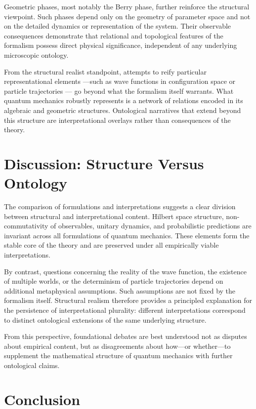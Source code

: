 Geometric phases, most notably the Berry phase, further reinforce the structural viewpoint.
Such phases depend only on the geometry of parameter space and not on the detailed dynamics
or representation of the system. Their observable consequences demonstrate that relational 
and topological features of the formalism possess direct physical significance, independent
of any underlying microscopic ontology.

From the structural realist standpoint, attempts to reify particular representational elements
---such as wave functions in configuration space or particle trajectories ---
go beyond what the formalism itself warrants. What quantum mechanics robustly represents
is a network of relations encoded in its algebraic and geometric structures. Ontological
narratives that extend beyond this structure are interpretational overlays rather than 
consequences of the theory.
\section{Discussion: Structure Versus Ontology}

The comparison of formulations and interpretations suggests a clear division between 
structural and interpretational content. Hilbert space structure, non-commutativity of 
observables, unitary dynamics, and probabilistic predictions are invariant across all
formulations of quantum mechanics. These elements form the stable core of the theory 
and are preserved under all empirically viable interpretations.

By contrast, questions concerning the reality of the wave function, the existence of
multiple worlds, or the determinism of particle trajectories depend on additional 
metaphysical assumptions. Such assumptions are not fixed by the formalism itself. 
Structural realism therefore provides a principled explanation for the persistence 
of interpretational plurality: different interpretations correspond to distinct 
ontological extensions of the same underlying structure.

From this perspective, foundational debates are best understood not as disputes
about empirical content, but as disagreements about how—or whether—to supplement 
the mathematical structure of quantum mechanics with further ontological claims.

\section{Conclusion}

